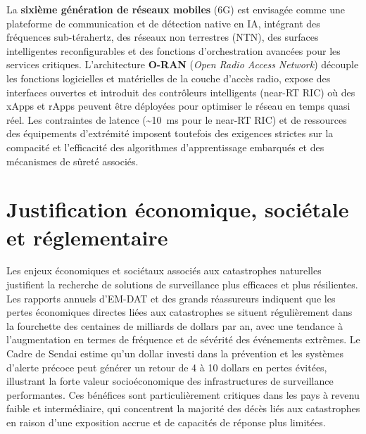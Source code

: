 La \textbf{sixième génération de réseaux mobiles} (6G) est envisagée comme une plateforme de communication et de détection native en IA, intégrant des fréquences sub-térahertz, des réseaux non terrestres (NTN), des surfaces intelligentes reconfigurables et des fonctions d'orchestration avancées pour les services critiques\cite{saad2020vision6g,amatetti2024ntn,abualigah_swarm_2023}. L'architecture \textbf{O-RAN} (\emph{Open Radio Access Network}) découple les fonctions logicielles et matérielles de la couche d'accès radio, expose des interfaces ouvertes et introduit des contrôleurs intelligents (near-RT RIC) où des xApps et rApps peuvent être déployées pour optimiser le réseau en temps quasi réel\cite{polese2023oran,oran_official_architecture,oran_survey_acm2024}. Les contraintes de latence (\textasciitilde 10~ms pour le near-RT RIC) et de ressources des équipements d'extrémité imposent toutefois des exigences strictes sur la compacité et l'efficacité des algorithmes d'apprentissage embarqués et des mécanismes de sûreté associés\cite{dasilva2024xapp,demichelis2025edge,demirel2026agentic}.

\section{Justification économique, sociétale et réglementaire}\label{sec:intro-justification}

Les enjeux économiques et sociétaux associés aux catastrophes naturelles justifient la recherche de solutions de surveillance plus efficaces et plus résilientes. Les rapports annuels d'EM-DAT et des grands réassureurs indiquent que les pertes économiques directes liées aux catastrophes se situent régulièrement dans la fourchette des centaines de milliards de dollars par an, avec une tendance à l'augmentation en termes de fréquence et de sévérité des événements extrêmes\cite{undrr2020,burgueno_salas_global_nodate,swiss_re_2025}. Le Cadre de Sendai estime qu'un dollar investi dans la prévention et les systèmes d'alerte précoce peut générer un retour de 4 à 10 dollars en pertes évitées, illustrant la forte valeur socioéconomique des infrastructures de surveillance performantes\cite{UNDRR2015Sendai}. Ces bénéfices sont particulièrement critiques dans les pays à revenu faible et intermédiaire, qui concentrent la majorité des décès liés aux catastrophes en raison d'une exposition accrue et de capacités de réponse plus limitées\cite{undrr2020,wmo2025climate}.

